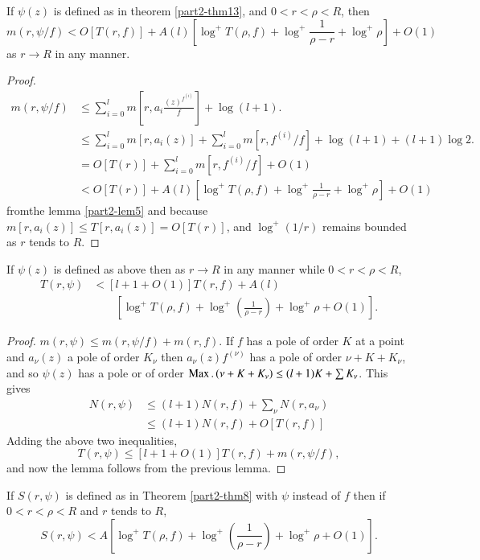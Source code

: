\begin{lem}\label{part2-lem6}
If $\psi(z)$ is defined as in theorem \ref{part2-thm13}, and
$0<r<\rho<R$, then
$m(r,\psi/f)<O[T(r,f)]+A(l)[\log^{+}T(\rho,f)+\log^{+}\dfrac{1}{\rho-r}+\log^{+}\rho]+O(1)$
as $r\to R$ in any manner.
\end{lem}

\begin{proof}
\begin{align*}
m(r,\psi/f) &\leq
\sum^{l}_{i=0}m\left[r,a_{i}\frac{(z)^{f^{(i)}}}{f}\right]+\log(l+1).\\ 
&\leq
\sum^{l}_{i=0}m[r,a_{i}(z)]+\sum^{l}_{i=0}m[r,f^{(i)}/f]+\log(l+1)+(l+1)\log
2.\\
&= O[T(r)]+\sum^{l}_{i=0}m[r,f^{(i)}/f]+O(1)\\
&<
O[T(r)]+A(l)\left[\log^{+}T(\rho,f)+\log^{+}\frac{1}{\rho-r}+\log^{+}\rho\right]+O(1) 
\end{align*}
from\pageoriginale the lemma \ref{part2-lem5} and because
$m[r,a_{i}(z)]\leq T[r,a_{i}(z)]=O[T(r)]$, and $\log^{+}(1/r)$ remains
bounded as $r$ tends to $R$.
\end{proof}

\begin{lem}\label{part2-lem7}
If $\psi(z)$ is defined as above then as $r\to R$ in any manner while
$0<r<\rho<R$,
\begin{align*}
T(r,\psi)&<[l+1+O(1)]T(r,f)+A(l)\\
&\qquad\left[\log^{+}T(\rho,f)+\log^{+}\left(\frac{1}{\rho-r}\right)+\log^{+}\rho+O(1)\right]. 
\end{align*}
\end{lem}

\begin{proof}
$m(r,\psi)\leq m(r,\psi/f)+m(r,f)$. If $f$ has a pole of order $K$ at
  a point and $a_{\nu}(z)$ a pole of order $K_{\nu}$ then
  $a_{\nu}(z)f^{(\nu)}$ has a pole of order $\nu+K+K_{\nu}$, and so
  $\psi(z)$ has a pole or of order $\operatorname{Max}.\, (\nu+K+K_{\nu})\leq
  (l+1)K+\sum K_{\nu}$. This gives
\begin{align*}
N(r,\psi) &\leq (l+1)N(r,f)+\sum_{\nu}N(r,a_{\nu})\\
&\leq (l+1)N(r,f)+O[T(r,f)]
\end{align*}
Adding the above two inequalities,
$$
T(r,\psi)\leq [l+1+O(1)]T(r,f)+m(r,\psi/f),
$$
and now the lemma follows from the previous lemma.
\end{proof}

\begin{lem}\label{part2-lem8}
If $S(r,\psi)$ is defined as in Theorem \ref{part2-thm8} with $\psi$
instead of $f$ then if $0<r<\rho<R$ and $r$ tends to $R$,
$$
S(r,\psi)<A\left[\log^{+}T(\rho,f)+\log^{+}\left(\frac{1}{\rho-r}\right)+\log^{+}\rho+O(1)\right]. 
$$
\end{lem}

